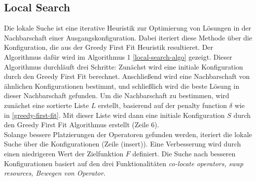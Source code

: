 \documentclass{article}
\begin{document}
\subsection{Local Search} \label{local-search}
Die lokale Suche ist eine iterative Heuristik zur Optimierung von Lösungen in der Nachbarschaft einer Ausgangskonfiguration.
Dabei iteriert diese Methode über die Konfiguration, die aus der Greedy First Fit Heuristik resultieret. Der Algorithmus dafür wird im Algorithmus 1 \ref{local-search-algo} gezeigt. 
Dieser Algorithmus durchläuft drei Schritte: Zunächst wird eine initiale Konfiguration durch den Greedy First Fit berechnet.
 Anschließend wird eine Nachbarschaft von ähnlichen Konfigurationen bestimmt, und schließlich wird die beste Lösung in dieser Nachbarschaft gefunden. 
 Um die Nachbarschaft zu bestimmen, wird zunächst eine sortierte Liste $L$ erstellt, basierend auf der penalty function $\delta$ wie in \ref{greedy-first-fit}.
Mit dieser Liste wird dann eine initiale Konfiguration $S$ durch den Greedy First Fit Algorithmus erstellt (Zeile 6). \\



Solange bessere Platzierungen der Operatoren gefunden werden, iteriert die lokale Suche über die Konfigurationen  (Zeile (insert)). 
Eine Verbesserung wird durch einen niedrigeren Wert der Zielfunktion $F$ definiert. 
Die Suche nach besseren Konfigurationen basiert auf den drei Funktionalitäten \textit{co-locate operators, swap resources, Bewegen von Operator}. \\
\end{document}
